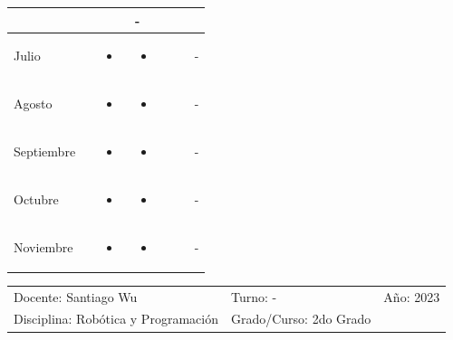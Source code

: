 \documentclass[landscape, a4paper, 10pt]{article}
\newcommand{\smallcellwidth}{0.7in}
\newcommand{\normalcellwidth}{1.2in}
\newcommand{\bigcellwidth}{2.0in}
\newcommand{\profesor}{Santiago Wu}
\newcommand{\discipline}{Robótica y Programación}
\newcommand{\currentyear}{2023}
\begin{document}
\begin{longtable}{|m{\smallcellwidth}|p{\normalcellwidth}|p{\bigcellwidth}|p{\bigcellwidth}|p{\normalcellwidth}|p{\normalcellwidth}|p{\normalcellwidth}|}
\begin{itemize}
		\end{itemize} &
		  &
		  &
		 - \\
		\hline
		Julio &
		 &
		\begin{itemize}
			\item 
		\end{itemize} &
		\begin{itemize}
			\item 
		\end{itemize} &
		  &
		  &
		 - \\
		\hline
		Agosto &
		 &
		\begin{itemize}
			\item 
		\end{itemize} &
		\begin{itemize}
			\item 
		\end{itemize} &
		  &
		  &
		 - \\
		\hline
		Septiembre &
		 &
		\begin{itemize}
			\item 
		\end{itemize} &
		\begin{itemize}
			\item 
		\end{itemize} &
		  &
		  &
		 - \\
		\hline
		Octubre &
		 &
		\begin{itemize}
			\item 
		\end{itemize} &
		\begin{itemize}
			\item 
		\end{itemize} &
		  &
		  &
		 - \\
		\hline
		Noviembre &
		 &
		\begin{itemize}
			\item 
		\end{itemize} &
		\begin{itemize}
			\item 
		\end{itemize} &
		  &
		  &
		 - \\
		\hline

	\end{longtable}
	\pagebreak[4]
	\begin{tabularx}{\textwidth}{ >{\raggedright\arraybackslash}X >{\raggedright\arraybackslash}X >{\raggedright\arraybackslash}X }
		Docente: \profesor &
		Turno: - &
		Año: \currentyear \\
		Disciplina: \discipline &
		Grado/Curso: 2do Grado &
		 \\
	\end{tabularx}
\end{document}
